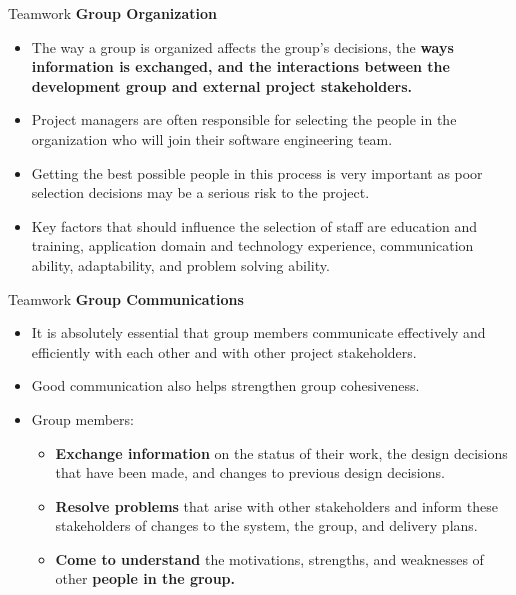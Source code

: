 \documentclass{beamer}
\begin{document}
\begin{frame}{Teamwork}
	\textbf{Group Organization}
	\begin{itemize}
		
		\item The way a group is organized affects the group’s decisions, the \textbf{ways 
			information is exchanged, and the interactions between the 
			development group and external project stakeholders. }
		\item Project managers are often responsible for selecting the people in the 
		organization who will join their software engineering team. 
		\item Getting the best possible people in this process is very important as 
		poor selection decisions may be a serious risk to the project. 
		\item Key factors that should influence the selection of staff are education 
		and training, application domain and technology experience, 
		communication ability, adaptability, and problem solving ability.

	\end{itemize}
\end{frame}
\begin{frame}{Teamwork}
	\textbf{Group Communications}
	\begin{itemize}
		\item It is absolutely essential that group members communicate effectively 
		and efficiently with each other and with other project stakeholders. 
		\item Good communication also helps strengthen group cohesiveness.
		\item Group members:

		\begin{itemize}
			\item \textbf{Exchange information} on the status of their work, the design decisions that 
			have been made, and changes to previous design decisions.
			\item\textbf{ Resolve problems} that arise with other stakeholders and inform these 
			stakeholders of changes to the system, the group, and delivery plans. 
			\item \textbf{Come to understand} the motivations, strengths, and weaknesses of other \textbf{people in the group.}
		\end{itemize}
	\end{itemize}
\end{frame}
\end{document}
